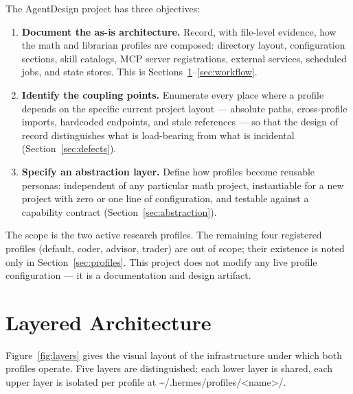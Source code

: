\documentclass[10pt]{article}
\newcommand{\mono}[1]{{\ttfamily\small #1}}
\begin{document}
The \mono{AgentDesign} project has three objectives:

\begin{enumerate}
    \item \textbf{Document the as-is architecture.} Record, with file-level evidence, how the
    math and librarian profiles are composed: directory layout, configuration sections, skill
    catalogs, MCP server registrations, external services, scheduled jobs, and state stores.
    This is Sections~\ref{sec:layers}--\ref{sec:workflow}.
    \item \textbf{Identify the coupling points.} Enumerate every place where a profile depends
    on the specific current project layout --- absolute paths, cross-profile imports, hardcoded
    endpoints, and stale references --- so that the design of record distinguishes what is
    load-bearing from what is incidental (Section~\ref{sec:defects}).
    \item \textbf{Specify an abstraction layer.} Define how profiles become reusable personas:
    independent of any particular math project, instantiable for a new project with zero or one
    line of configuration, and testable against a capability contract
    (Section~\ref{sec:abstraction}).
\end{enumerate}

The scope is the two active research profiles. The remaining four registered profiles
(\mono{default}, \mono{coder}, \mono{advisor}, \mono{trader}) are out of scope; their existence
is noted only in Section~\ref{sec:profiles}. This project does not modify any live profile
configuration --- it is a documentation and design artifact.

\section{Layered Architecture}\label{sec:layers}

Figure~\ref{fig:layers} gives the visual layout of the infrastructure under which both profiles
operate. Five layers are distinguished; each lower layer is shared, each upper layer is isolated
per profile at \mono{\textasciitilde/.hermes/profiles/<name>/}.
\end{document}
